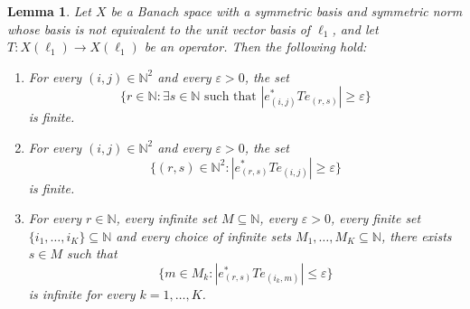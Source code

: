 \documentclass[11pt]{amsart}
\theoremstyle{plain}
\newtheorem{lemma}[theorem]{Lemma}
\theoremstyle{definition}
\numberwithin{equation}{section}
\newcommand{\N}{\mathbb{N}}
\renewcommand{\leq}{\leqslant}
\renewcommand{\geq}{\geqslant}
\begin{document}
\begin{lemma}\label{lmm: ell1-iterated-interference}
    Let $X$ be a Banach space with a symmetric basis and symmetric norm whose basis is not equivalent to the unit vector basis of $\ell_1$, and let $T \colon X(\ell_1) \to X(\ell_1)$ be an operator. Then the following hold:
\begin{enumerate}[label = (\alph*), ref = (\alph*)]
        \item \label{it: ell1-a} For every $(i,j) \in \N^2$ and every $\varepsilon > 0$, the set 
        \begin{equation*}
            \{r \in \N: \exists s \in \N \text{ such that } |e^*_{(i,j)} T e_{(r,s)}| \geq \varepsilon\}
        \end{equation*}
        is finite.
        \item \label{it: ell1-b} For every $(i,j) \in \N^2$ and every $\varepsilon >0$, the set
        \begin{equation*}
            \{(r,s) \in \N^2: |e^*_{(r,s)} T e_{(i,j)}| \geq \varepsilon\}
        \end{equation*}
        is finite.
        \item \label{it: ell1-c} For every $r \in \N$, every infinite set $M \subseteq \N$, every $\varepsilon > 0$, every finite set $\{i_1, \dots, i_K\}\subseteq \N$ and every choice of infinite sets $M_1, \dots, M_K \subseteq \N$, there exists $s \in M$ such that 
        \begin{equation*}
            \{m \in M_k: |e^*_{(r, s)} T e_{(i_k, m)}| \leq \varepsilon \}
        \end{equation*}
        is infinite for every $k = 1, \dots, K$.
    \end{enumerate}
\end{lemma}
\end{document}
